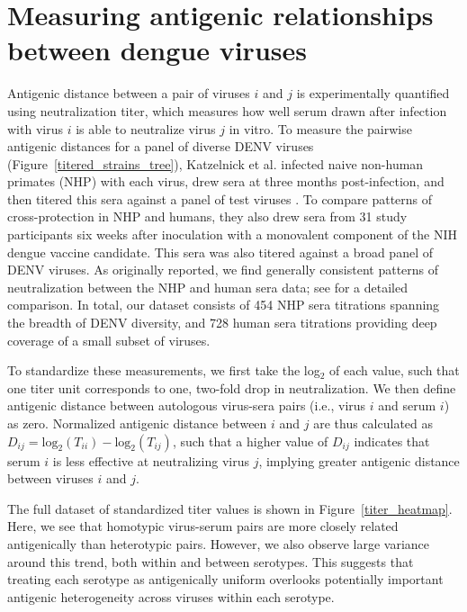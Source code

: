 \section{Measuring antigenic relationships between dengue viruses}
Antigenic distance between a pair of viruses $i$ and $j$ is experimentally quantified using neutralization titer, which measures how well serum drawn after infection with virus $i$ is able to neutralize virus $j$ in vitro\citep{russell1967dengue}.
To measure the pairwise antigenic distances for a panel of diverse DENV viruses (Figure~\ref{titered_strains_tree}), Katzelnick et al. infected naive non-human primates (NHP) with each virus, drew sera at three months post-infection, and then titered this sera against a panel of test viruses \citep{katzelnick2015dengue}.
To compare patterns of cross-protection in NHP and humans, they also drew sera from 31 study participants six weeks after inoculation with a monovalent component of the NIH dengue vaccine candidate.
This sera was also titered against a broad panel of DENV viruses.
As originally reported, we find generally consistent patterns of neutralization between the NHP and human sera data; see \citep{katzelnick2015dengue} for a detailed comparison.
In total, our dataset consists of 454 NHP sera titrations spanning the breadth of DENV diversity, and 728 human sera titrations providing deep coverage of a small subset of viruses.

To standardize these measurements, we first take the log$_2$ of each value, such that one titer unit corresponds to one, two-fold drop in neutralization.
We then define antigenic distance between autologous virus-sera pairs (i.e., virus $i$ and serum $i$) as zero.
Normalized antigenic distance between $i$ and $j$ are thus calculated as $D_{ij} = \mathrm{log}_2(T_{ii}) - \mathrm{log}_2(T_{ij})$, such that a higher value of $D_{ij}$ indicates that serum $i$ is less effective at neutralizing virus $j$, implying greater antigenic distance between viruses $i$ and $j$.

The full dataset of standardized titer values is shown in Figure~\ref{titer_heatmap}.
Here, we see that homotypic virus-serum pairs are more closely related antigenically than heterotypic pairs.
However, we also observe large variance around this trend, both within and between serotypes.
This suggests that treating each serotype as antigenically uniform overlooks potentially important antigenic heterogeneity across viruses within each serotype.

